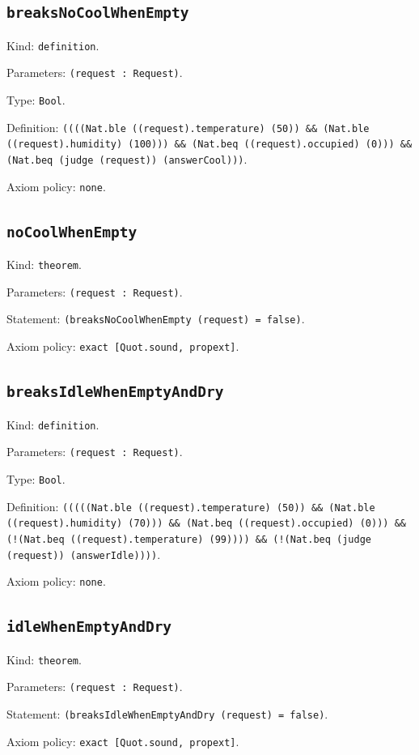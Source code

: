 \documentclass[11pt]{article}
\begin{document}
\subsection*{\texttt{breaksNoCoolWhenEmpty}}
\noindent Kind: \texttt{definition}.\par
\noindent Parameters: \texttt{(request : Request)}.\par
\noindent Type: \texttt{Bool}.\par
\noindent Definition: \texttt{((((Nat.ble ((request).temperature) (50)) \&\& (Nat.ble ((request).humidity) (100))) \&\& (Nat.beq ((request).occupied) (0))) \&\& (Nat.beq (judge (request)) (answerCool)))}.\par
\noindent Axiom policy: \texttt{none}.\par
\subsection*{\texttt{noCoolWhenEmpty}}
\noindent Kind: \texttt{theorem}.\par
\noindent Parameters: \texttt{(request : Request)}.\par
\noindent Statement: \texttt{(breaksNoCoolWhenEmpty (request) = false)}.\par
\noindent Axiom policy: \texttt{exact [Quot.sound, propext]}.\par
\subsection*{\texttt{breaksIdleWhenEmptyAndDry}}
\noindent Kind: \texttt{definition}.\par
\noindent Parameters: \texttt{(request : Request)}.\par
\noindent Type: \texttt{Bool}.\par
\noindent Definition: \texttt{(((((Nat.ble ((request).temperature) (50)) \&\& (Nat.ble ((request).humidity) (70))) \&\& (Nat.beq ((request).occupied) (0))) \&\& (!(Nat.beq ((request).temperature) (99)))) \&\& (!(Nat.beq (judge (request)) (answerIdle))))}.\par
\noindent Axiom policy: \texttt{none}.\par
\subsection*{\texttt{idleWhenEmptyAndDry}}
\noindent Kind: \texttt{theorem}.\par
\noindent Parameters: \texttt{(request : Request)}.\par
\noindent Statement: \texttt{(breaksIdleWhenEmptyAndDry (request) = false)}.\par
\noindent Axiom policy: \texttt{exact [Quot.sound, propext]}.\par
\end{document}
